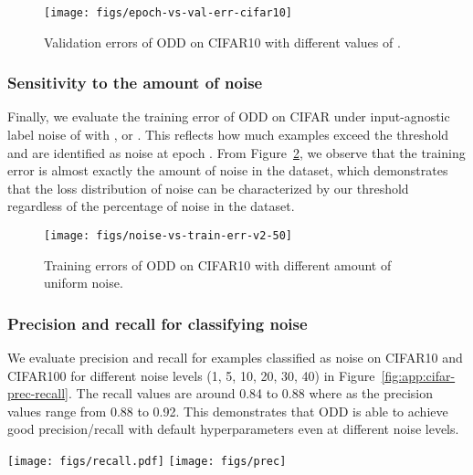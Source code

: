 \documentclass[a4paper,11pt]{article}
\begin{document}
\begin{figure}[h]
\centering
\texttt{[image: figs/epoch-vs-val-err-cifar10]}
\caption{Validation errors of \textsc{ODD} on CIFAR10 with different values of .
}
\label{fig:app:epoch-vs-val-error}
\end{figure}

\subsubsection{Sensitivity to the amount of noise} Finally, we evaluate the training error of \textsc{ODD} on CIFAR under input-agnostic label noise of  with ,  or . This reflects how much examples exceed the threshold and are identified as noise at epoch . From Figure~\ref{fig:app:noise-vs-train-error}, we observe that the training error is almost exactly the amount of noise in the dataset, which demonstrates that the loss distribution of noise can be characterized by our threshold regardless of the percentage of noise in the dataset.

\begin{figure}
\centering
\texttt{[image: figs/noise-vs-train-err-v2-50]}
\caption{Training errors of \textsc{ODD} on CIFAR10 with different amount of uniform noise.
}
\label{fig:app:noise-vs-train-error}
\end{figure}















\subsubsection{Precision and recall for classifying noise} We evaluate precision and recall for examples classified as noise on CIFAR10 and CIFAR100 for different noise levels (1, 5, 10, 20, 30, 40) in Figure~\ref{fig:app:cifar-prec-recall}. The recall values are around 0.84 to 0.88 where as the precision values range from 0.88 to 0.92. This demonstrates that \textsc{ODD} is able to achieve good precision/recall with default hyperparameters even at different noise levels.

\begin{figure*}[htbp]
\centering
\texttt{[image: figs/recall.pdf]}
\hspace*{0.05\textwidth}
\texttt{[image: figs/prec]}
\caption{Recall and precision for \textsc{ODD} on CIFAR10 and CIFAR100 with different levels of uniform random noise. }
\label{fig:app:cifar-prec-recall}
\end{figure*}
\end{document}
